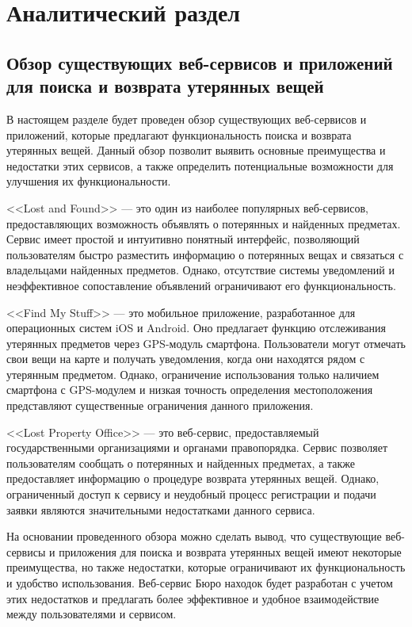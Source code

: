 \documentclass{mirea}
\begin{document}
\section{Аналитический раздел}


\subsection{Обзор существующих веб-сервисов и приложений для поиска и возврата утерянных вещей}

В настоящем разделе будет проведен обзор существующих веб-сервисов 
и приложений, которые предлагают функциональность поиска 
и возврата утерянных вещей. Данный обзор позволит выявить 
основные преимущества и недостатки этих сервисов, 
а также определить потенциальные возможности для улучшения их функциональности.

<<Lost and Found>> --- это один из наиболее популярных веб-сервисов, 
предоставляющих возможность объявлять о потерянных и найденных предметах. 
Сервис имеет простой и интуитивно понятный интерфейс, 
позволяющий пользователям быстро разместить информацию 
о потерянных вещах и связаться с владельцами найденных предметов. 
Однако, отсутствие системы уведомлений и неэффективное сопоставление 
объявлений ограничивают его функциональность.

<<Find My Stuff>> --- это мобильное приложение, разработанное 
для операционных систем iOS и Android. Оно предлагает функцию отслеживания 
утерянных предметов через GPS-модуль смартфона. Пользователи могут отмечать 
свои вещи на карте и получать уведомления, когда они находятся рядом с утерянным предметом. 
Однако, ограничение использования только наличием смартфона с GPS-модулем 
и низкая точность определения местоположения представляют 
существенные ограничения данного приложения.

<<Lost Property Office>> --- это веб-сервис, предоставляемый 
государственными организациями и органами правопорядка. 
Сервис позволяет пользователям сообщать о потерянных 
и найденных предметах, а также предоставляет информацию 
о процедуре возврата утерянных вещей. Однако, 
ограниченный доступ к сервису и неудобный процесс регистрации 
и подачи заявки являются значительными недостатками данного сервиса.

На основании проведенного обзора можно сделать вывод, 
что существующие веб-сервисы и приложения для поиска и возврата 
утерянных вещей имеют некоторые преимущества, но также недостатки, 
которые ограничивают их функциональность и удобство использования. 
Веб-сервис Бюро находок будет разработан с учетом этих недостатков 
и предлагать более эффективное и удобное взаимодействие 
между пользователями и сервисом.
\end{document}

